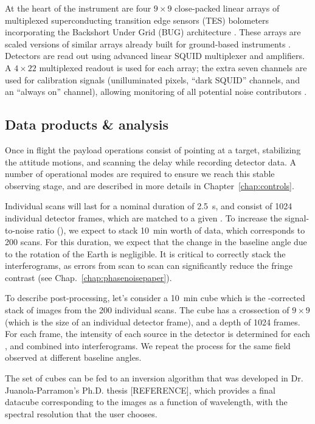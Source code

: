 At the heart of the instrument are four $9\times 9$ close-packed linear arrays of multiplexed superconducting transition edge sensors (TES) bolometers \citep{Benford:2008wk} incorporating the Backshort Under Grid (BUG) architecture \citep{Allen:2006jn}. These arrays are scaled versions of similar arrays already built for ground-based instruments \citep[e.g., GISMO,][]{Staguhn:2014jg}. Detectors are read out using advanced linear SQUID multiplexer and amplifiers. A $4\times 22$ multiplexed readout is used for each array; the extra seven channels are used for calibration signals (unilluminated pixels, “dark SQUID” channels, and an “always on” channel), allowing monitoring of all potential noise contributors \citep{deKorte:2003km}.  






\subsection{Data products \& analysis}


Once in flight the payload operations consist of pointing at a target, stabilizing the attitude motions, and scanning the delay while recording detector data. A number of operational modes are required to ensure we reach this stable observing stage, and are described in more details in Chapter~\ref{chap:controls}. 

Individual scans will last for a nominal duration of \SI{2.5}{\second}, and consist of \si{1024} individual detector frames, which are matched to a given \OPD. To increase the signal-to-noise ratio (\SNR), we expect to stack \SI{10}{\minute} worth of data, which corresponds to 200 scans. For this duration, we expect that the change in the baseline angle due to the rotation of the Earth is negligible. It is critical to correctly stack the interferograms, as \OPD errors from scan to scan can significantly reduce the fringe contrast (see Chap.~\ref{chap:phasenoisepaper}).

To describe post-processing, let's consider a \SI{10}{\minute} cube which is the {\OPD}-corrected stack of images from the 200 individual scans. The cube has a crossection of $9\times 9$ (which is the size of an individual detector frame), and a depth of 1024 frames. For each frame, the intensity of each source in the detector is determined for each \OPD, and combined into interferograms. We repeat the process for the same field observed at different baseline angles. 

The set of cubes can be fed to an inversion algorithm that was developed in Dr. Juanola-Parramon's Ph.D. thesis [REFERENCE], which provides a final datacube corresponding to the images as a function of wavelength, with the spectral resolution that the user chooses. 

